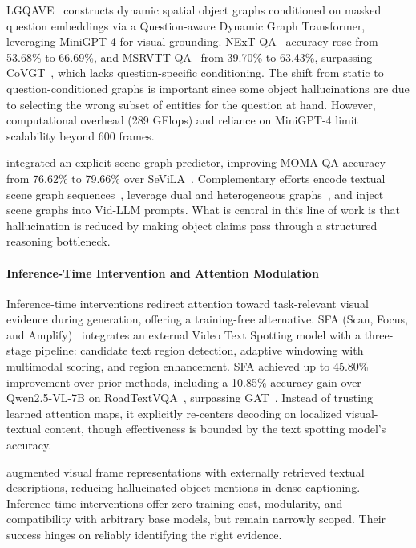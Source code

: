 \documentclass[10pt]{article} %
\begin{document}
LGQAVE~\citep{Rongali2024FoundationMA} constructs dynamic spatial object graphs conditioned on masked question embeddings via a Question-aware Dynamic Graph Transformer, leveraging MiniGPT-4 for visual grounding. NExT-QA~\citep{xiao2021next} accuracy rose from 53.68\% to 66.69\%, and MSRVTT-QA~\citep{xu2016msr-vtt} from 39.70\% to 63.43\%, surpassing CoVGT~\citep{Xiao2023ContrastiveVQ}, which lacks question-specific conditioning. The shift from static to question-conditioned graphs is important since some object hallucinations are due to selecting the wrong subset of entities for the question at hand. However, computational overhead (289 GFlops) and reliance on MiniGPT-4 limit scalability beyond 600 frames.

\citet{Dai2025TowardsFV} integrated an explicit scene graph predictor, improving MOMA-QA accuracy from 76.62\% to 79.66\% over SeViLA~\citep{Yu2023SelfChainedIM}. Complementary efforts encode textual scene graph sequences~\citep{Linok2025DyGEncEA}, leverage dual and heterogeneous graphs~\citep{Liang2025LeveragingSR}, and inject scene graphs into Vid-LLM prompts. What is central in this line of work is that hallucination is reduced by making object claims pass through a structured reasoning bottleneck. 

\paragraph{Inference-Time Intervention and Attention Modulation}

Inference-time interventions redirect attention toward task-relevant visual evidence during generation, offering a training-free alternative. SFA (Scan, Focus, and Amplify)~\citep{He2025SFASF} integrates an external Video Text Spotting model with a three-stage pipeline: candidate text region detection, adaptive windowing with multimodal scoring, and region enhancement. SFA achieved up to 45.80\% improvement over prior methods, including a 10.85\% accuracy gain over Qwen2.5-VL-7B on RoadTextVQA~\citep{tom2023reading}, surpassing GAT~\citep{Zhang2025GatherAT}. Instead of trusting learned attention maps, it explicitly re-centers decoding on localized visual-textual content, though effectiveness is bounded by the text spotting model's accuracy.

\citet{Jung2023RetrievalaugmentedVE} augmented visual frame representations with externally retrieved textual descriptions, reducing hallucinated object mentions in dense captioning.
Inference-time interventions offer zero training cost, modularity, and compatibility with arbitrary base models, but remain narrowly scoped. Their success hinges on reliably identifying the right evidence.
\end{document}
